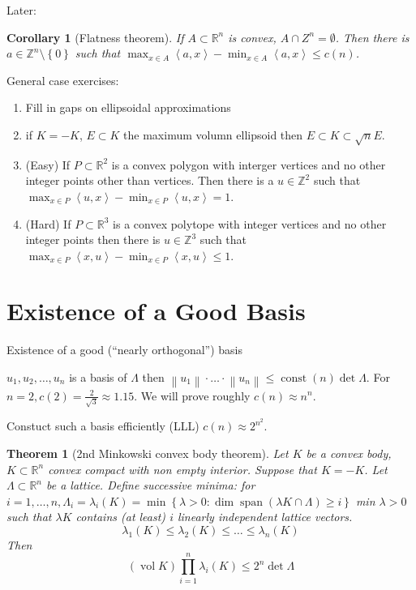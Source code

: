 \documentclass{report}
\newcommand{\R}{\mathbb{R}}
\newcommand{\Z}{\mathbb{Z}}
\newcommand{\vol}{\operatorname{vol}}
\newcommand{\inner}[2]{\left\langle #1, #2\right\rangle}
\newcommand{\norm}[1]{\left\| #1 \right\|}
\newcommand{\set}[1]{\left\{ #1 \right\}}
\newtheorem{theorem}{Theorem}[section]
\newtheorem{corollary}{Corollary}[section]
\theoremstyle{definition}
\theoremstyle{remark}
\numberwithin{equation}{section}
\begin{document}
Later:
\begin{corollary}[Flatness theorem]
    If $A \subset \R^n$ is convex, $A \cap Z^n = \emptyset$. Then there is $a \in \Z^n \setminus \set{0}$ such that $\max_{x\in A} \inner{a}{x} - \min_{x\in A} \inner{a}{x} \leq c(n)$.
\end{corollary}

General case exercises:
\begin{enumerate}
    \item Fill in gaps on ellipsoidal approximations
    \item if $K = -K$, $E \subset K$ the maximum volumn ellipsoid then $E \subset K \subset \sqrt{n}E$.
    \item (Easy) If $P \subset \R^2$ is a convex polygon with interger vertices and no other integer points other than vertices. Then there is a $u \in \Z^2$ such that $\max_{x \in P} \inner{u}{x} - \min_{x \in P} \inner{u}{x} = 1$.
    \item (Hard) If $P \subset \R^3$ is a convex polytope with integer vertices and no other integer points then there is $u \in \Z^3$ such that $\max_{x \in P}\inner{x}{u} - \min_{x \in P}\inner{x}{u} \leq 1$.
\end{enumerate}

\section{Existence of a Good Basis}
Existence of a good (``nearly orthogonal'') basis

$u_1, u_2, \ldots, u_n$ is a basis of $\Lambda$ then $\norm{u_1}\cdot\ldots\cdot\norm{u_n} \leq \operatorname{const}(n)\det\Lambda$. For $n = 2, c(2) = \frac{2}{\sqrt{3}} \approx 1.15$. We will prove roughly $c(n) \approx n^n$.

Constuct such a basis efficiently (LLL) $c(n) \approx 2^{n^2}$.

\begin{theorem}[2nd Minkowski convex body theorem]
    Let $K$ be a convex body, $K \subset \R^n$ convex compact with non empty interior. Suppose that $K = -K$. Let $\Lambda \subset \R^n$ be a lattice. Define successive minima: for $i = 1, \ldots, n, \Lambda_i = \lambda_i(K) = \min \set{
        \lambda > 0: \dim \operatorname{span}(\lambda K \cap \Lambda) \geq i
    }$ min $\lambda > 0$ such that $\lambda K$ contains (at least) $i$ linearly independent lattice vectors.
    \[\lambda_1(K) \leq \lambda_2(K) \leq \ldots \leq \lambda_n(K)\]
    Then \[\left(\vol K\right)\prod_{i=1}^n \lambda_i (K) \leq 2^n \det \Lambda\]
\end{theorem}
\end{document}
